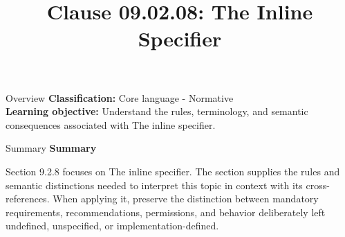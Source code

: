 \documentclass[10pt,letterpaper]{article}
\title{Clause 09.02.08: The Inline Specifier}
\author{}
\date{}
\begin{document}
\maketitle
\begin{CornellOverviewBox}{Overview}
\textbf{Classification:} Core language - Normative\\[2pt]
\textbf{Learning objective:} Understand the rules, terminology, and semantic consequences associated with The inline specifier.
\end{CornellOverviewBox}\begin{CornellSummaryBox}{Summary}
{\sffamily\bfseries\color{Accent} Summary}\par\vspace{3pt}Section 9.2.8 focuses on The inline specifier. The section supplies the rules and semantic distinctions needed to interpret this topic in context with its cross-references. When applying it, preserve the distinction between mandatory requirements, recommendations, permissions, and behavior deliberately left undefined, unspecified, or implementation-defined.
\end{CornellSummaryBox}
\end{document}
